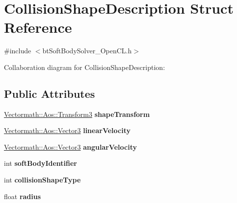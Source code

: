 \hypertarget{struct_collision_shape_description}{\section{Collision\+Shape\+Description Struct Reference}
\label{struct_collision_shape_description}
}


{\ttfamily \#include $<$bt\+Soft\+Body\+Solver\+\_\+\+Open\+C\+L.\+h$>$}



Collaboration diagram for Collision\+Shape\+Description\+:
\subsection*{Public Attributes}
\begin{DoxyCompactItemize}
\item 
\hypertarget{struct_collision_shape_description_af28b18c4a0e1942e12ee9f28642c3286}{\hyperlink{class_vectormath_1_1_aos_1_1_transform3}{Vectormath\+::\+Aos\+::\+Transform3} {\bfseries shape\+Transform}}\label{struct_collision_shape_description_af28b18c4a0e1942e12ee9f28642c3286}

\item 
\hypertarget{struct_collision_shape_description_a69423fce245d8fb825d6aafe1475ba22}{\hyperlink{class_vectormath_1_1_aos_1_1_vector3}{Vectormath\+::\+Aos\+::\+Vector3} {\bfseries linear\+Velocity}}\label{struct_collision_shape_description_a69423fce245d8fb825d6aafe1475ba22}

\item 
\hypertarget{struct_collision_shape_description_aba3bdcba5f16943810fc73702749d57a}{\hyperlink{class_vectormath_1_1_aos_1_1_vector3}{Vectormath\+::\+Aos\+::\+Vector3} {\bfseries angular\+Velocity}}\label{struct_collision_shape_description_aba3bdcba5f16943810fc73702749d57a}

\item 
\hypertarget{struct_collision_shape_description_a5f63282bb444dbc67da3cd35c03a4e5f}{int {\bfseries soft\+Body\+Identifier}}\label{struct_collision_shape_description_a5f63282bb444dbc67da3cd35c03a4e5f}

\item 
\hypertarget{struct_collision_shape_description_a8c76d05f25a8f611735e7b28e6144fab}{int {\bfseries collision\+Shape\+Type}}\label{struct_collision_shape_description_a8c76d05f25a8f611735e7b28e6144fab}

\item 
\hypertarget{struct_collision_shape_description_ad975bb1c00d6a2f9e6362a53bf0ac245}{float {\bfseries radius}}\label{struct_collision_shape_description_ad975bb1c00d6a2f9e6362a53bf0ac245}


\end{DoxyCompactItemize}
